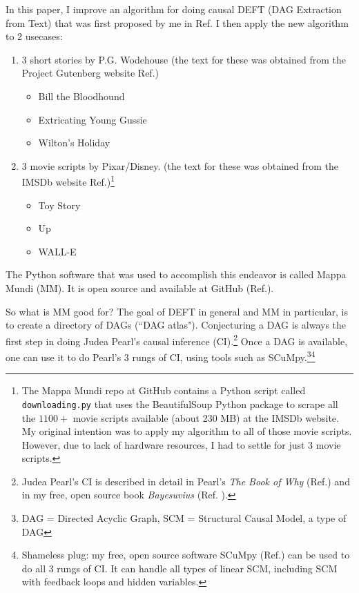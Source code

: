 \documentclass[12pt]{article}
\begin{document}
In this paper, I improve an algorithm
for doing causal DEFT (DAG Extraction from Text)
that was
first proposed by me in Ref.\cite{deft1}
I then apply the new algorithm to 2 usecases:
\begin{enumerate}

\item 3 short stories by P.G. Wodehouse
(the text for these was obtained from the
Project Gutenberg website Ref.\cite{project-gutenberg}) 

\begin{itemize}
\item  Bill the Bloodhound
\item  Extricating Young Gussie
\item Wilton's Holiday
\end{itemize}

\item 3 movie scripts by Pixar/Disney.
(the text for these was obtained from the IMSDb website
Ref.\cite{imsdb})\footnote{The Mappa Mundi repo at GitHub
contains a Python script called {\tt downloading.py}
that uses the BeautifulSoup Python
package to scrape all the $1100+$ movie
scripts available (about 230 MB) at the IMSDb website.
My original intention
was to apply my algorithm to 
all of those movie scripts.
However, due to lack of
hardware resources, I had to 
settle for just 3 movie scripts.}

\begin{itemize}
\item Toy Story 
\item Up
\item WALL-E
\end{itemize}
\end{enumerate}

The Python 
software that was used to 
accomplish this endeavor is 
called Mappa Mundi (MM). It is open source and available
at GitHub (Ref.\cite{github-mappa-mundi}).



So what is MM good for? The goal of DEFT in general and MM in particular, is to create a directory 
of DAGs (``DAG atlas").
Conjecturing
a DAG is always the first step
in doing Judea Pearl's causal inference (CI).\footnote{Judea Pearl's CI is described
in detail in Pearl's {\it The Book of Why}
(Ref.\cite{book-of-why})
and in my free, open source book {\it Bayesuvius} (Ref. \cite{bayesuvius}).}
Once a DAG is available,
one can use it to 
do Pearl's 3 rungs of CI,
using tools such as SCuMpy.\footnote{DAG = Directed Acyclic Graph, SCM = Structural Causal Model, a type of DAG}\footnote{Shameless plug: my free, open source software
SCuMpy (Ref.\cite{scumpy})
can be used to do all 3 rungs
of CI. 
It can handle all types of linear SCM, including
SCM with feedback loops and hidden variables.} 
\end{document}
